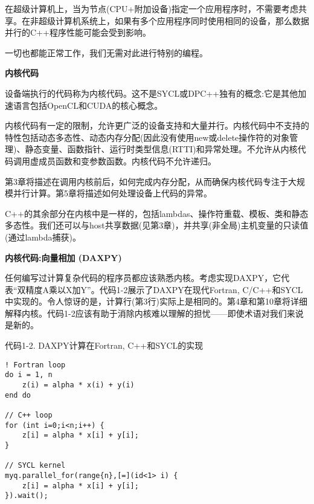 在超级计算机上，当为节点(CPU+附加设备)指定一个应用程序时，不需要考虑共享。在非超级计算机系统上，如果有多个应用程序同时使用相同的设备，那么数据并行的C++程序性能可能会受到影响。\par

一切也都能正常工作，我们无需对此进行特别的编程。\par

\hspace*{\fill} \par %
\textbf{内核代码}

设备端执行的代码称为内核代码。这不是SYCL或DPC++独有的概念:它是其他加速语言包括OpenCL和CUDA的核心概念。\par

内核代码有一定的限制，允许更广泛的设备支持和大量并行。内核代码中不支持的特性包括动态多态性、动态内存分配(因此没有使用new或delete操作符的对象管理)、静态变量、函数指针、运行时类型信息(RTTI)和异常处理。不允许从内核代码调用虚成员函数和变参数函数。内核代码不允许递归。\par

第3章将描述在调用内核前后，如何完成内存分配，从而确保内核代码专注于大规模并行计算。第5章将描述如何处理设备上代码的异常。\par

C++的其余部分在内核中是一样的，包括lambdas、操作符重载、模板、类和静态多态性。我们还可以与host共享数据(见第3章)，并共享(非全局)主机变量的只读值(通过lambda捕获)。\par

\hspace*{\fill} \par %
\textbf{内核代码:向量相加 (DAXPY)}

任何编写过计算复杂代码的程序员都应该熟悉内核。考虑实现DAXPY，它代表“双精度A乘以X加Y”。代码1-2展示了DAXPY在现代Fortran, C/C++和SYCL中实现的。令人惊讶的是，计算行(第3行)实际上是相同的。第4章和第10章将详细解释内核。代码1-2应该有助于消除内核难以理解的担忧——即使术语对我们来说是新的。\par

代码1-2. DAXPY计算在Fortran, C++和SYCL的实现
\begin{lstlisting}[caption={}]
! Fortran loop
do i = 1, n
	z(i) = alpha * x(i) + y(i)
end do

// C++ loop
for (int i=0;i<n;i++) {
	z[i] = alpha * x[i] + y[i];
}

// SYCL kernel
myq.parallel_for(range{n},[=](id<1> i) {
	z[i] = alpha * x[i] + y[i];
}).wait();
\end{lstlisting}

